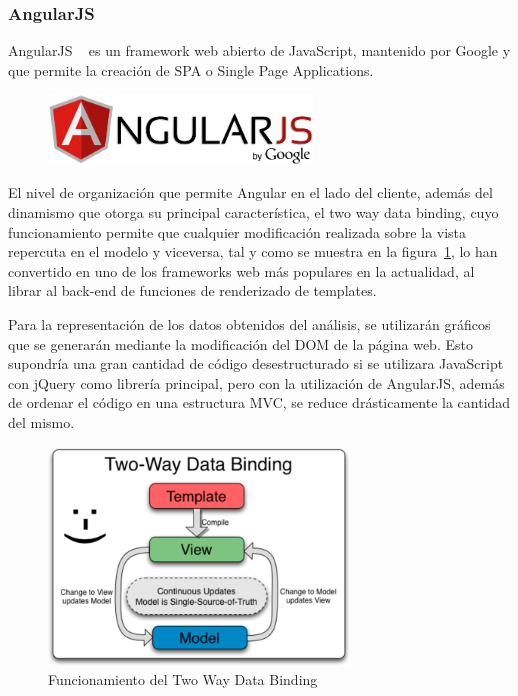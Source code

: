 \documentclass[a4paper, spanish, 12pt]{book}
\begin{document}
\subsubsection*{AngularJS}
\label{subsec:angularjs}

AngularJS ~\cite{angular} es un framework web abierto de JavaScript, mantenido por Google y que
permite la creaci\'on de SPA o Single Page Applications.

\begin{figure}[H]
  \centering
  \includegraphics[width=7cm, keepaspectratio]{img/angular-logo}
\end{figure}

El nivel de organizaci\'on que permite Angular en el lado del cliente, adem\'as del
dinamismo que otorga su principal caracter\'istica, el two way data binding, cuyo
funcionamiento permite que cualquier modificaci\'on realizada sobre la vista
repercuta en el modelo y viceversa, tal y como se muestra en la figura~\ref{fig:2waydatabinding},
lo han convertido en uno de los frameworks web m\'as populares en la actualidad,
al librar al back-end de funciones de renderizado de templates.

Para la representaci\'on de los datos obtenidos del an\'alisis, se utilizar\'an
gr\'aficos que se generar\'an mediante la modificaci\'on del DOM de la p\'agina web.
Esto supondr\'ia una gran cantidad de c\'odigo desestructurado si se utilizara JavaScript con jQuery
como librer\'ia principal, pero con la utilizaci\'on de AngularJS, adem\'as de
ordenar el c\'odigo en una estructura MVC, se reduce dr\'asticamente la cantidad
del mismo.

\begin{figure}[H]
    \centering
    \includegraphics[width=8cm, keepaspectratio]{img/2waydatabinding}
    \caption{Funcionamiento del Two Way Data Binding}
    \label{fig:2waydatabinding}
\end{figure}
\end{document}
